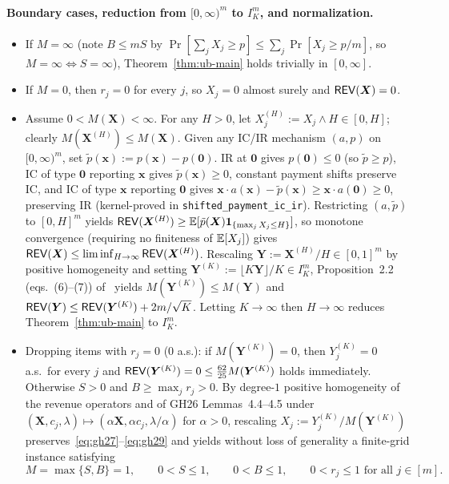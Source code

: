 \paragraph{Boundary cases, reduction from $[0,\infty)^m$ to $I_K^m$, and normalization.}
\begin{itemize}
  \item If $M = \infty$ (note $B \le mS$ by $\Pr[\sum_j X_j \ge p] \le \sum_j \Pr[X_j \ge p/m]$, so $M = \infty \iff S = \infty$), Theorem~\ref{thm:ub-main} holds trivially in $[0,\infty]$.
  \item If $M = 0$, then $r_j = 0$ for every $j$, so $X_j = 0$ almost surely and $\mathsf{REV}(\bm{X}) = 0$.
  \item Assume $0 < M(\bm{X}) < \infty$. For any $H > 0$, let $X_j^{(H)} := X_j \wedge H \in [0,H]$; clearly $M(\bm{X}^{(H)}) \le M(\bm{X})$. Given any IC/IR mechanism $(a,p)$ on $[0,\infty)^m$, set $\tilde{p}(\bm{x}) := p(\bm{x}) - p(\bm{0})$. IR at $\bm{0}$ gives $p(\bm{0}) \le 0$ (so $\tilde{p} \ge p$), IC of type $\bm{0}$ reporting $\bm{x}$ gives $\tilde{p}(\bm{x}) \ge 0$, constant payment shifts preserve IC, and IC of type $\bm{x}$ reporting $\bm{0}$ gives $\bm{x}\cdot a(\bm{x}) - \tilde{p}(\bm{x}) \ge \bm{x}\cdot a(\bm{0}) \ge 0$, preserving IR (kernel-proved in \texttt{shifted\_payment\_ic\_ir}). Restricting $(a,\tilde{p})$ to $[0,H]^m$ yields $\mathsf{REV}(\bm{X}^{(H)}) \ge \mathbb{E}[\tilde{p}(\bm{X})\mathbf{1}_{\{\max_j X_j \le H\}}]$, so monotone convergence (requiring no finiteness of $\mathbb{E}[X_j]$) gives $\mathsf{REV}(\bm{X}) \le \liminf_{H\to\infty}\mathsf{REV}(\bm{X}^{(H)})$. Rescaling $\bm{Y} := \bm{X}^{(H)}/H \in [0,1]^m$ by positive homogeneity and setting $\bm{Y}^{(K)} := \lfloor K\bm{Y}\rfloor/K \in I_K^m$, Proposition~2.2 (eqs.~(6)--(7)) of~\cite{GiannakopoulosHahn26} yields $M(\bm{Y}^{(K)}) \le M(\bm{Y})$ and $\mathsf{REV}(\bm{Y}) \le \mathsf{REV}(\bm{Y}^{(K)}) + 2m/\sqrt{K}$. Letting $K \to \infty$ then $H \to \infty$ reduces Theorem~\ref{thm:ub-main} to $I_K^m$.
  \item Dropping items with $r_j = 0$ ($0$ a.s.): if $M(\bm{Y}^{(K)}) = 0$, then $Y_j^{(K)} = 0$ a.s.\ for every $j$ and $\mathsf{REV}(\bm{Y}^{(K)}) = 0 \le \frac{62}{25}M(\bm{Y}^{(K)})$ holds immediately. Otherwise $S > 0$ and $B \ge \max_j r_j > 0$. By degree-$1$ positive homogeneity of the revenue operators and of GH26 Lemmas~4.4--4.5 under $(\bm{X}, c_j, \lambda) \mapsto (\alpha\bm{X}, \alpha c_j, \lambda/\alpha)$ for $\alpha > 0$, rescaling $X_j := Y_j^{(K)} / M(\bm{Y}^{(K)})$ preserves~\eqref{eq:gh27}--\eqref{eq:gh29} and yields without loss of generality a finite-grid instance satisfying
  \begin{equation}\label{eq:norm}
    M = \max\{S, B\} = 1, \qquad 0 < S \le 1, \qquad 0 < B \le 1, \qquad 0 < r_j \le 1 \text{ for all } j \in [m].
  \end{equation}
\end{itemize}


